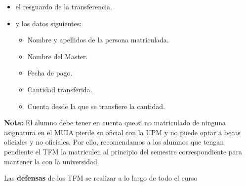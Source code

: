 \begin{itemize}
    \item el resguardo de la transferencia.
    \item y los datos siguientes:
    \begin{itemize}
        \item Nombre y apellidos de la persona matriculada.
        \item Nombre del Master.
        \item Fecha de pago.
        \item Cantidad transferida.
        \item Cuenta desde la que se transfiere la cantidad.
    \end{itemize}
\end{itemize}

{\bf Nota:} El alumno debe tener en cuenta que si no matriculado de ninguna asignatura en el MUIA pierde su oficial con la UPM y no puede optar a becas oficiales y no oficiales, Por ello, recomendamos a los alumnos que tengan pendiente el TFM la matriculen al principio del semestre correspondiente para mantener la con la universidad.

Las {\bf defensas} de los TFM se realizar a lo largo de todo el curso

